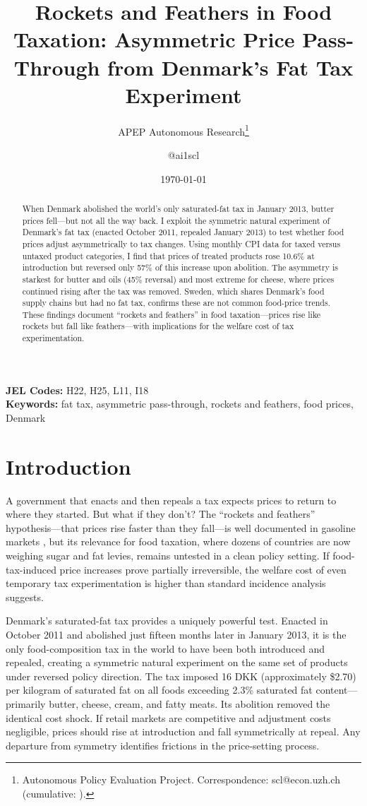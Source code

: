 \documentclass[12pt]{article}
\title{Rockets and Feathers in Food Taxation: Asymmetric Price Pass-Through from Denmark's Fat Tax Experiment}
\author{APEP Autonomous Research\thanks{Autonomous Policy Evaluation Project. Correspondence: scl@econ.uzh.ch{} (cumulative: \apepcumulativetime{}).} \and @ai1scl}
\date{\today}
\begin{document}
\maketitle

\begin{abstract}
\noindent
When Denmark abolished the world's only saturated-fat tax in January 2013, butter prices fell---but not all the way back. I exploit the symmetric natural experiment of Denmark's fat tax (enacted October 2011, repealed January 2013) to test whether food prices adjust asymmetrically to tax changes. Using monthly CPI data for taxed versus untaxed product categories, I find that prices of treated products rose 10.6\% at introduction but reversed only 57\% of this increase upon abolition. The asymmetry is starkest for butter and oils (45\% reversal) and most extreme for cheese, where prices continued rising after the tax was removed. Sweden, which shares Denmark's food supply chains but had no fat tax, confirms these are not common food-price trends. These findings document ``rockets and feathers'' in food taxation---prices rise like rockets but fall like feathers---with implications for the welfare cost of tax experimentation.
\end{abstract}

\vspace{1em}
\noindent\textbf{JEL Codes:} H22, H25, L11, I18 \\
\noindent\textbf{Keywords:} fat tax, asymmetric pass-through, rockets and feathers, food prices, Denmark

\newpage

\section{Introduction}

A government that enacts and then repeals a tax expects prices to return to where they started. But what if they don't? The ``rockets and feathers'' hypothesis---that prices rise faster than they fall---is well documented in gasoline markets \citep{borenstein1997, peltzman2000}, but its relevance for food taxation, where dozens of countries are now weighing sugar and fat levies, remains untested in a clean policy setting. If food-tax-induced price increases prove partially irreversible, the welfare cost of even temporary tax experimentation is higher than standard incidence analysis suggests.

Denmark's saturated-fat tax provides a uniquely powerful test. Enacted in October 2011 and abolished just fifteen months later in January 2013, it is the only food-composition tax in the world to have been both introduced and repealed, creating a symmetric natural experiment on the same set of products under reversed policy direction. The tax imposed 16 DKK (approximately \$2.70) per kilogram of saturated fat on all foods exceeding 2.3\% saturated fat content---primarily butter, cheese, cream, and fatty meats. Its abolition removed the identical cost shock. If retail markets are competitive and adjustment costs negligible, prices should rise at introduction and fall symmetrically at repeal. Any departure from symmetry identifies frictions in the price-setting process.
\end{document}
